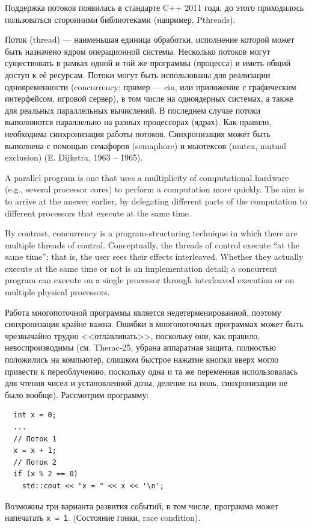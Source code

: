 \documentclass{book}
\begin{document}
Поддержка потоков появилась в стандарте C++ 2011 года, до этого приходилось
пользоваться сторонними библиотеками (например, Pthreads).

Поток (thread) --- наименьшая единица обработки, исполнение которой может быть назначено ядром
операционной системы. Несколько потоков могут существовать в рамках одной и той же программы
(процесса) и иметь общий доступ к её ресурсам.  Потоки могут быть использованы для реализации
одновременности (concurrency; пример --- cin, или приложение с графическим интерфейсом, игровой
сервер), в том числе на одноядерных системах, а также для реальных параллельных вычислений. В
последнем случае потоки выполняются параллельно на разных процессорах (ядрах). Как правило,
необходима синхронизация работы потоков. Синхронизация может быть выполнена с помощью семафоров
(semaphore) и мьютексов (mutex, mutual exclusion) (E.  Dijkstra, 1963 -- 1965).

A parallel program is one that uses a multiplicity of computational hardware (e.g., several
processor cores) to perform a computation more quickly. The aim is to arrive at the answer earlier,
by delegating different parts of the computation to different processors that execute at the same
time.

By contrast, concurrency is a program-structuring technique in which there are multiple threads of
control. Conceptually, the threads of control execute “at the same time”; that is, the user sees
their effects interleaved. Whether they actually execute at the same time or not is an
implementation detail; a concurrent program can execute on a single processor through interleaved
execution or on multiple physical processors.

Работа многопоточной программы является недетерменированной, поэтому
синхронизация крайне важна. Ошибки в многопоточных программах может быть
чрезвычайно трудно <<отлавливать>>, поскольку они, как правило,
невоспроизводимы (см. Therac-25, убрана аппаратная защита, полностью положились на компьютер,
слишком быстрое нажатие кнопки вверх могло привести к переоблучению, поскольку одна и та же
переменная использовалась для чтения чисел и установленной дозы, деление на ноль, синхронизации не
было вообще). Рассмотрим программу:
\begin{verbatim}
  int x = 0;
  ...
  // Поток 1
  x = x + 1;
  // Поток 2
  if (x % 2 == 0)
    std::cout << "x = " << x << '\n';
\end{verbatim}
Возможны три варианта развития событий, в том числе, программа может напечатать 
\texttt{x = 1}. (Состояние гонки, race condition).
\end{document}
